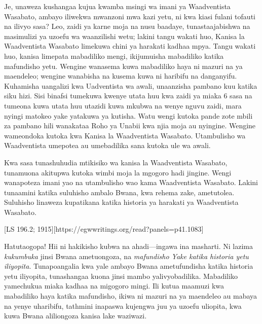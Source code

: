 Je, unaweza kushangaa kujua kwamba msingi wa imani ya Waadventista Wasabato, ambayo iliwekwa mwanzoni mwa kazi yetu, ni kwa kiasi fulani tofauti na ilivyo sasa? Leo, zaidi ya karne moja na nusu baadaye, tunastaajabishwa na masimulizi ya uzoefu wa waanzilishi wetu; lakini tangu wakati huo, Kanisa la Waadventista Wasabato limekuwa chini ya harakati kadhaa mpya. Tangu wakati huo, kanisa limepata mabadiliko mengi, ikijumuisha mabadiliko katika mafundisho yetu. Wengine wanasema kuwa mabadiliko haya ni mazuri na ya maendeleo; wengine wanabisha na kusema kuwa ni haribifu na danganyifu. Kuhamisha uangalizi kwa Uadventista wa awali, unaanzisha pambano kuu katika siku hizi. Sisi binafsi tumekuwa kwenye utata huu kwa zaidi ya miaka 6 sasa na tumeona kuwa utata huu utazidi kuwa mkubwa na wenye nguvu zaidi, mara nyingi matokeo yake yatakuwa ya kutisha. Watu wengi kutoka pande zote mbili za pambano hili wanakataa Roho ya Unabii kwa njia moja au nyingine. Wengine wameondoka kutoka kwa Kanisa la Waadventista Wasabato. Utambulisho wa Waadventista umepotea au umebadilika sana kutoka ule wa awali.

Kwa sasa tunashuhudia mtikisiko wa kanisa la Waadventista Wasabato, tunamuona akitupwa kutoka wimbi moja la mgogoro hadi jingine. Wengi wanapoteza imani yao na utambulisho wao kama Waadventista Wasabato. Lakini tunaamini katika suluhisho ambalo Bwana, kwa rehema zake, ametutolea. Suluhisho linaweza kupatikana katika historia ya harakati ya Waadventista Wasabato.

[LS 196.2; 1915][https://egwwritings.org/read?panels=p41.1083]

Hatutaogopa! Hii ni hakikisho kubwa na ahadi—ingawa ina masharti. Ni lazima \textit{kukumbuka} jinsi Bwana ametuongoza, na \textit{mafundisho Yake katika historia yetu iliyopita}. Tunapoangalia kwa yale ambayo Bwana ametufundisha katika historia yetu iliyopita, tunashangaa kuona jinsi mambo yalivyobadilika. Mabadiliko yamechukua miaka kadhaa na migogoro mingi. Ili kutua maamuzi kwa mabadiliko haya katika mafundisho, ikiwa ni mazuri na ya maendeleo au mabaya na yenye uharibifu, tathmini inapaswa kujengwa juu ya uzoefu uliopita, kwa kuwa Bwana aliliongoza kanisa lake waziwazi.

